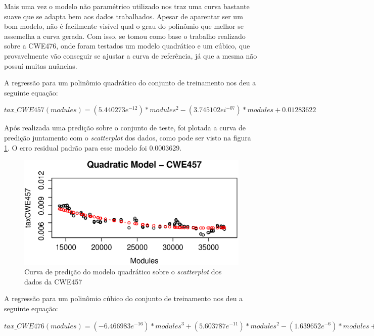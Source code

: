 Mais uma vez o modelo não paramétrico utilizado nos traz uma curva bastante
suave que se adapta bem aos dados trabalhados. Apesar de aparentar ser um bom
modelo, não é facilmente visível qual o grau do polinômio que melhor se
assemelha a curva gerada. Com isso, se tomou como base o trabalho realizado
sobre a CWE476, onde foram testados um modelo quadrático e um cúbico, que
provavelmente vão conseguir se ajustar a curva de referência, já que a mesma não
possuí muitas nuâncias.

A regressão para um polinômio quadrático do conjunto de treinamento nos deu a
seguinte equação:

\begin{math}
 tax\_CWE457(modules) = (5.440273e^{-12}) * modules^{2} - (3.745102ei^{-07}) *
modules + 0.01283622 
\end{math}

Após realizada uma predição sobre o conjunto de teste, foi plotada a curva de
predição juntamento com o \textit{scatterplot} dos dados, como pode ser visto na
figura \ref{fig:cwe457-quadratic}. O erro residual padrão para esse modelo foi
0.0003629.

\begin{figure}[h]
  \centering
  \includegraphics[width=1.0\textwidth]
      {figuras/cwe457-quadratic.eps}
      \caption{Curva de predição do modelo quadrático sobre o \textit{scatterplot}
      dos dados da CWE457}
  \label{fig:cwe457-quadratic}
\end{figure}

A regressão para um polinômio cúbico do conjunto de treinamento nos deu a
seguinte equação:

\begin{math}
 tax\_CWE476(modules) = (-6.466983e^{-16}) * modules^{3} + (5.603787e^{-11}) *
 modules^{2} - (1.639652e^{-6}) * modules + 0.02287291
\end{math}

